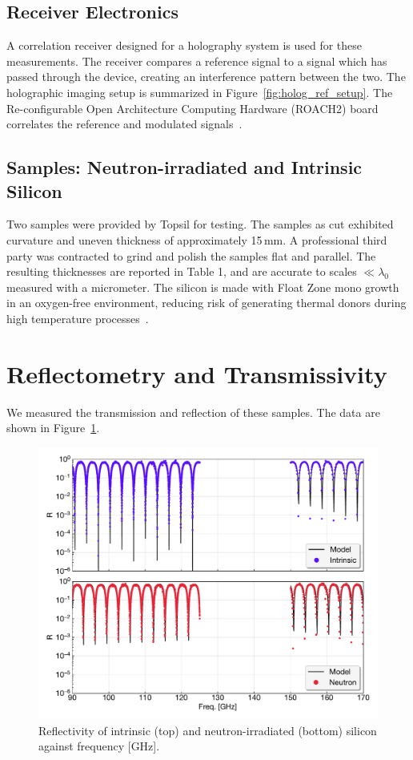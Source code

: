 \subsection{Receiver Electronics}
A correlation receiver designed for a holography system is used for these measurements. The receiver compares a reference signal to a signal which has passed through the device, creating an interference pattern between the two.   The holographic imaging setup is summarized in Figure~\ref{fig:holog_ref_setup}.   The Re-configurable Open Architecture Computing Hardware (ROACH2) board correlates the reference and modulated signals~\cite{roach2}.

\subsection{Samples: Neutron-irradiated and Intrinsic Silicon}
Two samples were provided by Topsil for testing. The samples as cut exhibited curvature and uneven thickness of approximately 15\,mm. A professional third party was contracted to grind and polish the samples flat and parallel. The
resulting thicknesses are reported in Table 1, and are accurate to scales $\ll \lambda_0$ measured with a micrometer. The silicon is made with Float Zone mono growth in an oxygen-free environment, reducing risk of generating thermal donors during
high temperature processes~\cite{topsil}.
\section{Reflectometry and Transmissivity}
We measured the transmission and reflection of these samples. The data are shown in Figure~\ref{fig:si_data}.
\begin{figure}[t]
    \centering
    \includegraphics[width = .9\textwidth]{Figures/silicon_refl.pdf}
    \caption{Reflectivity of intrinsic (top) and neutron-irradiated (bottom) silicon against frequency [GHz].}
    \label{fig:si_data}
\end{figure}
